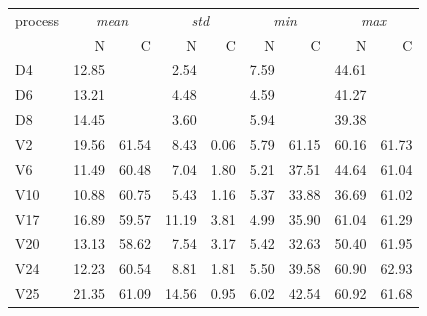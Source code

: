 \documentclass[12 pt]{scrartcl}
\begin{document}
\begin{table}[ht]
  \centering
  \label{tab:aacfstats}
  \begin{tabular}{l|rr|rr|rr|rr}
    process & \multicolumn{2}{c|}{\emph{mean}} & \multicolumn{2}{c|}{\emph{std}} & \multicolumn{2}{c|}{\emph{min}} & \multicolumn{2}{c|}{\emph{max}}                                \\
            & N                                & C                               & N                               & C                               & N    & C     & N     & C     \\
    \hline
    D4      & 12.85                            &                                 & 2.54                            &                                 & 7.59 &       & 44.61 &       \\
    D6      & 13.21                            &                                 & 4.48                            &                                 & 4.59 &       & 41.27 &       \\
    D8      & 14.45                            &                                 & 3.60                            &                                 & 5.94 &       & 39.38 &       \\
    V2      & 19.56                            & 61.54                           & 8.43                            & 0.06                            & 5.79 & 61.15 & 60.16 & 61.73 \\
    V6      & 11.49                            & 60.48                           & 7.04                            & 1.80                            & 5.21 & 37.51 & 44.64 & 61.04 \\
    V10     & 10.88                            & 60.75                           & 5.43                            & 1.16                            & 5.37 & 33.88 & 36.69 & 61.02 \\
    V17     & 16.89                            & 59.57                           & 11.19                           & 3.81                            & 4.99 & 35.90 & 61.04 & 61.29 \\
    V20     & 13.13                            & 58.62                           & 7.54                            & 3.17                            & 5.42 & 32.63 & 50.40 & 61.95 \\
    V24     & 12.23                            & 60.54                           & 8.81                            & 1.81                            & 5.50 & 39.58 & 60.90 & 62.93 \\
    V25     & 21.35                            & 61.09                           & 14.56                           & 0.95                            & 6.02 & 42.54 & 60.92 & 61.68 \\
  \end{tabular}
\end{table}
\end{document}
